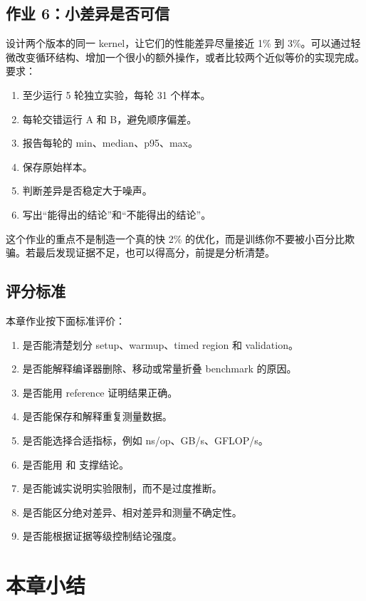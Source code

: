 \begin{exercisebox}
\subsection*{作业 6：小差异是否可信}

设计两个版本的同一 kernel，让它们的性能差异尽量接近 1\% 到 3\%。可以通过轻微改变循环结构、增加一个很小的额外操作，或者比较两个近似等价的实现完成。要求：

\begin{enumerate}
  \item 至少运行 5 轮独立实验，每轮 31 个样本。
  \item 每轮交错运行 A 和 B，避免顺序偏差。
  \item 报告每轮的 min、median、p95、max。
  \item 保存原始样本。
  \item 判断差异是否稳定大于噪声。
  \item 写出“能得出的结论”和“不能得出的结论”。
\end{enumerate}

这个作业的重点不是制造一个真的快 2\% 的优化，而是训练你不要被小百分比欺骗。若最后发现证据不足，也可以得高分，前提是分析清楚。

\subsection*{评分标准}

本章作业按下面标准评价：

\begin{enumerate}
  \item 是否能清楚划分 setup、warmup、timed region 和 validation。
  \item 是否能解释编译器删除、移动或常量折叠 benchmark 的原因。
  \item 是否能用 reference 证明结果正确。
  \item 是否能保存和解释重复测量数据。
  \item 是否能选择合适指标，例如 ns/op、GB/s、GFLOP/s。
  \item 是否能用  和  支撑结论。
  \item 是否能诚实说明实验限制，而不是过度推断。
  \item 是否能区分绝对差异、相对差异和测量不确定性。
  \item 是否能根据证据等级控制结论强度。
\end{enumerate}
\end{exercisebox}

\section{本章小结}

